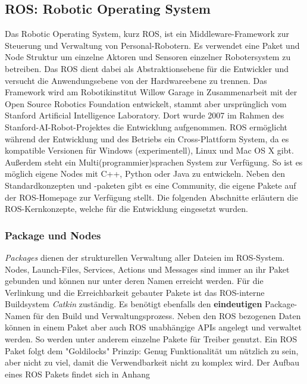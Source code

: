 \subsection{ROS: Robotic Operating System}
\label{sec:basic-ros}
    
Das Robotic Operating System, kurz ROS, ist ein Middleware-Framework zur Steuerung und Verwaltung von Personal-Robotern. Es verwendet eine Paket und Node Struktur um einzelne Aktoren und Sensoren einzelner Robotersystem zu betreiben. Das ROS dient dabei als Abstraktionsebene für die Entwickler und versucht die Anwendungsebene von der Hardwareebene zu trennen. Das Framework wird am Robotikinstitut Willow Garage in Zusammenarbeit mit der Open Source Robotics Foundation entwickelt, stammt aber ursprünglich vom Stanford Artificial Intelligence Laboratory. Dort wurde 2007 im Rahmen des Stanford-AI-Robot-Projektes die Entwicklung aufgenommen. ROS ermöglicht während der Entwicklung und des Betriebs ein Cross-Plattform System, da es kompatible Versionen für Windows (experimentell), Linux und Mac OS X gibt. Außerdem steht ein Multi(programmier)sprachen System zur Verfügung. So ist es möglich eigene Nodes mit C++, Python oder Java zu entwickeln.\cite{quigley2009ros} Neben den Standardkonzepten und -paketen gibt es eine Community, die eigene Pakete auf der ROS-Homepage zur Verfügung stellt. Die folgenden Abschnitte erläutern die ROS-Kernkonzepte, welche für die Entwicklung eingesetzt wurden.

\subsubsection{Package und Nodes}

\textit{Packages} dienen der strukturellen Verwaltung aller Dateien im ROS-System. Nodes, Launch-Files, Services, Actions und Messages sind immer an ihr Paket gebunden und können nur unter deren Namen erreicht werden. Für die Verlinkung und die Erreichbarkeit gebauter Pakete ist das ROS-interne Buildsystem \textit{Catkin} zuständig. Es benötigt ebenfalls den \textbf{eindeutigen} Package-Namen für den Build und Verwaltungsprozess. Neben den ROS bezogenen Daten können in einem Paket aber auch ROS unabhängige APIs angelegt und verwaltet werden. So werden unter anderem einzelne Pakete für Treiber genutzt. Ein ROS Paket folgt dem "Goldilocks" Prinzip: Genug Funktionalität um nützlich zu sein, aber nicht zu viel, damit die Verwendbarkeit nicht zu komplex wird. Der Aufbau eines ROS Pakets findet sich in Anhang %

